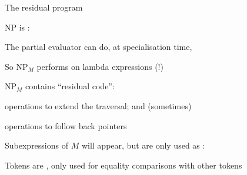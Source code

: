 \documentclass[12pt,fleqn,landscape]{article}
\begin{document}
\begin{slide}{The  residual program\ \    }


 NP   is :
\vair

\hfill{}
\vair\vair


\bi
\item The partial evaluator can do, at specialisation time, 

\hfill {}
\vair\vair

\item So NP$_M$ performs  on  lambda expressions (!)
\vair\vair

\item NP$_M$ contains  ``residual code'':
\bi
\item operations to extend the traversal; and (sometimes)

\item operations to follow back pointers
\ei
\vair\vair

\item Subexpressions of $M$ will appear, but are only used as : 

Tokens are , only used for equality comparisons with other tokens

\ei\end{slide}



\end{document}
